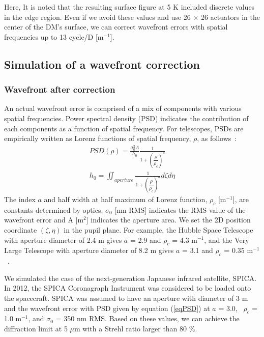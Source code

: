 \documentclass[a4paper]{article}
\begin{document}
Here, It is noted that the resulting surface figure at 5 K included discrete values in the edge region. Even if we avoid these values and use 26 $\times$ 26 actuators in the center of the DM's surface, we can correct wavefront errors with spatial frequencies up to 13 cycle/D [m$^{-1}$].


\subsection{Simulation of a wavefront correction}

\subsubsection{Wavefront after correction}
An actual wavefront error is comprised of a mix of components with various spatial frequencies. Power spectral density (PSD) indicates the contribution of each components as a function of spatial frequency. For telescopes, PSDs are empirically written as Lorenz functions of spatial frequency, $\rho$, as follows~\cite{PSD}:
\begin{align}
PSD(\rho) = \frac{\sigma_{0}^{2} A}{h_{0}} \frac{1}{1+ \left( \dfrac{\rho}{\rho_{c}} \right) ^{a}} \label{eqPSD}\\
h_{0} = \iint_{aperture} \frac{1}{1+ \left( \dfrac{\rho}{\rho_{c}} \right) ^{a}} d \zeta d \eta
\end{align}
The index $a$ and half width at half maximum of Lorenz function, $\rho_{c}$ [m$^{-1}$], are constants determined by optics. $\sigma_{0}$ [nm RMS] indicates the RMS value of the wavefront error and A [m$^2$] indicates the aperture area. We set the 2D position coordinate $(\zeta, \eta)$ in the pupil plane. For example, the Hubble Space Telescope with aperture diameter of 2.4 m gives $a$ = 2.9 and $\rho_{c}$ = 4.3 m$^{-1}$, and the Very Large Telescope with aperture diameter of 8.2 m gives $a$ = 3.1 and $\rho_{c}$ = 0.35 m$^{-1}$~\cite{HST_and_VLT}.

We simulated the case of the next-generation Japanese infrared satellite, SPICA. In 2012, the SPICA Coronagraph Instrument was considered to be loaded onto the spacecraft. SPICA was assumed to have an aperture with diameter of 3 m and the wavefront error with PSD given by equation (\ref{eqPSD}) at $a$ = 3.0, ~$\rho_{c}$ = 1.0 m$^{-1}$, and $\sigma_{0}$ = 350 nm RMS. Based on these values, we can achieve the diffraction limit at 5 $\mu$m with a Strehl ratio larger than 80 $\%$. 
\end{document}
